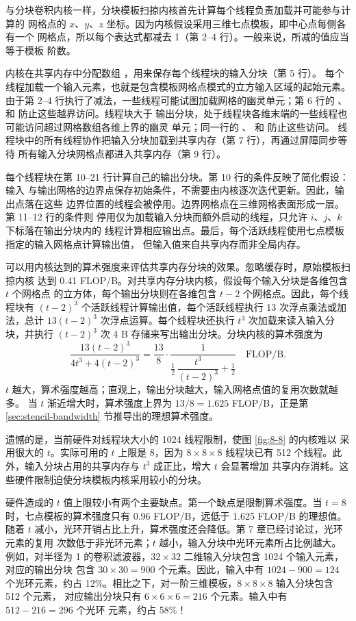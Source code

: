 与分块卷积内核一样，分块模板扫掠内核首先计算每个线程负责加载并可能参与计算的
网格点的 $x$、$y$、$z$ 坐标。因为内核假设采用三维七点模板，即中心点每侧各有一个
网格点，所以每个表达式都减去 1（第 2--4 行）。一般来说，所减的值应当等于模板
阶数。

内核在共享内存中分配数组 ，用来保存每个线程块的输入分块（第 5 行）。
每个线程加载一个输入元素，也就是包含模板网格点模式的立方输入区域的起始元素。
由于第 2--4 行执行了减法，一些线程可能试图加载网格的幽灵单元；第 6 行的
、 和  防止这些越界访问。线程块大于
输出分块，处于线程块各维末端的一些线程也可能访问超过网格数组各维上界的幽灵
单元；同一行的 、 和  防止这些访问。
线程块中的所有线程协作把输入分块加载到共享内存（第 7 行），再通过屏障同步等待
所有输入分块网格点都进入共享内存（第 9 行）。

每个线程块在第 10--21 行计算自己的输出分块。第 10 行的条件反映了简化假设：输入
与输出网格的边界点保存初始条件，不需要由内核逐次迭代更新。因此，输出点落在这些
边界位置的线程会被停用。边界网格点在三维网格表面形成一层。第 11--12 行的条件则
停用仅为加载输入分块而额外启动的线程，只允许 $i$、$j$、$k$ 下标落在输出分块内的
线程计算相应输出点。最后，每个活跃线程使用七点模板指定的输入网格点计算输出值，
但输入值来自共享内存而非全局内存。

可以用内核达到的算术强度来评估共享内存分块的效果。忽略缓存时，原始模板扫掠内核
达到 0.41 FLOP/B。对共享内存分块内核，假设每个输入分块是各维包含 $t$ 个网格点
的立方体，每个输出分块则在各维包含 $t-2$ 个网格点。因此，每个线程块有
$(t-2)^3$ 个活跃线程计算输出值，每个活跃线程执行 13 次浮点乘法或加法，总计
$13(t-2)^3$ 次浮点运算。每个线程块还执行 $t^3$ 次加载来读入输入分块，并执行
$(t-2)^3$ 次 4 B 存储来写出输出分块。分块内核的算术强度为
\[
  \frac{13(t-2)^3}{4t^3+4(t-2)^3}
  =\frac{13}{8}\cdot
    \frac{1}{\tfrac12\,\dfrac{t^3}{(t-2)^3}+\tfrac12}
  \quad\text{FLOP/B}.
\]
$t$ 越大，算术强度越高；直观上，输出分块越大，输入网格点值的复用次数就越多。
当 $t$ 渐近增大时，算术强度上界为 $13/8=1.625$ FLOP/B，正是第
\ref{sec:stencil-bandwidth} 节推导出的理想算术强度。

遗憾的是，当前硬件对线程块大小的 1024 线程限制，使图 \ref{fig:8-8} 的内核难以
采用很大的 $t$。实际可用的 $t$ 上限是 8，因为 $8\times8\times8$ 线程块已有
512 个线程。此外，输入分块占用的共享内存与 $t^3$ 成正比，增大 $t$ 会显著增加
共享内存消耗。这些硬件限制迫使分块模板内核采用较小的分块。

硬件造成的 $t$ 值上限较小有两个主要缺点。第一个缺点是限制算术强度。当 $t=8$
时，七点模板的算术强度只有 0.96 FLOP/B，远低于 1.625 FLOP/B 的理想值。随着
$t$ 减小，光环开销占比上升，算术强度还会降低。第 7 章已经讨论过，光环元素的复用
次数低于非光环元素；$t$ 越小，输入分块中光环元素所占比例越大。例如，对半径为 1
的卷积滤波器，$32\times32$ 二维输入分块包含 1024 个输入元素，对应的输出分块
包含 $30\times30=900$ 个元素。因此，输入中有 $1024-900=124$ 个光环元素，约占
12\%。相比之下，对一阶三维模板，$8\times8\times8$ 输入分块包含 512 个元素，
对应输出分块只有 $6\times6\times6=216$ 个元素。输入中有 $512-216=296$ 个光环
元素，约占 58\%！

